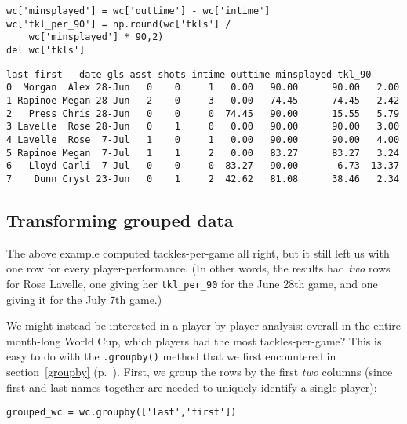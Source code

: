 \begin{Verbatim}[fontsize=\small,samepage=true,frame=single,framesep=3mm]
wc['minsplayed'] = wc['outtime'] - wc['intime']
wc['tkl_per_90'] = np.round(wc['tkls'] /
    wc['minsplayed'] * 90,2)
del wc['tkls']
\end{Verbatim}
\vspace{-.2in}

\begin{Verbatim}[fontsize=\scriptsize,samepage=true,frame=leftline,framesep=5mm,framerule=1mm]
     last first   date gls asst shots intime outtime minsplayed tkl_90
0  Morgan  Alex 28-Jun   0    0     1   0.00   90.00      90.00   2.00
1 Rapinoe Megan 28-Jun   2    0     3   0.00   74.45      74.45   2.42
2   Press Chris 28-Jun   0    0     0  74.45   90.00      15.55   5.79
3 Lavelle  Rose 28-Jun   0    1     0   0.00   90.00      90.00   3.00
4 Lavelle  Rose  7-Jul   1    0     1   0.00   90.00      90.00   4.00
5 Rapinoe Megan  7-Jul   1    1     2   0.00   83.27      83.27   3.24
6   Lloyd Carli  7-Jul   0    0     0  83.27   90.00       6.73  13.37
7    Dunn Cryst 23-Jun   0    1     2  42.62   81.08      38.46   2.34
\end{Verbatim}

\subsection{Transforming grouped data}

The above example computed tackles-per-game all right, but it still left us
with one row for every player-performance. (In other words, the results had
\textit{two} rows for Rose Lavelle, one giving her \texttt{tkl\_per\_90} for
the June 28th game, and one giving it for the July 7th game.)


We might instead be interested in a player-by-player analysis: overall in the
entire month-long World Cup, which players had the most tackles-per-game? This
is easy to do with the \texttt{.groupby()} method that we first encountered in
section~\ref{groupby} (p.~\pageref{groupby}). First, we group the rows by the
first \textit{two} columns (since first-and-last-names-together are needed to
uniquely identify a single player):


\begin{Verbatim}[fontsize=\footnotesize,samepage=true,frame=single,framesep=3mm]
grouped_wc = wc.groupby(['last','first'])
\end{Verbatim}

